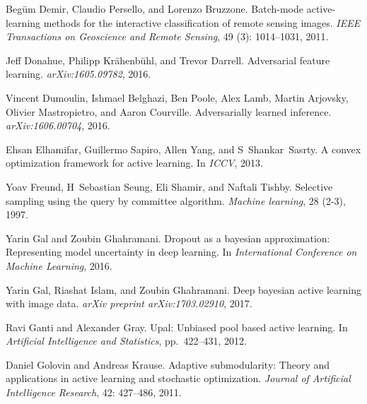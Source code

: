 \documentclass{article} \usepackage{iclr2018_conference,times}
\begin{document}
\begin{thebibliography}{51}
Beg{\"u}m Demir, Claudio Persello, and Lorenzo Bruzzone.
\newblock Batch-mode active-learning methods for the interactive classification
  of remote sensing images.
\newblock \emph{IEEE Transactions on Geoscience and Remote Sensing},
  49 (3): 1014--1031, 2011.

Jeff Donahue, Philipp Kr{\"a}henb{\"u}hl, and Trevor Darrell.
\newblock Adversarial feature learning.
\newblock \emph{arXiv:1605.09782}, 2016.

Vincent Dumoulin, Ishmael Belghazi, Ben Poole, Alex Lamb, Martin Arjovsky,
  Olivier Mastropietro, and Aaron Courville.
\newblock Adversarially learned inference.
\newblock \emph{arXiv:1606.00704}, 2016.

Ehsan Elhamifar, Guillermo Sapiro, Allen Yang, and S~Shankar~Sasrty.
\newblock A convex optimization framework for active learning.
\newblock In \emph{ICCV}, 2013.

Yoav Freund, H~Sebastian Seung, Eli Shamir, and Naftali Tishby.
\newblock Selective sampling using the query by committee algorithm.
\newblock \emph{Machine learning}, 28 (2-3), 1997.

Yarin Gal and Zoubin Ghahramani.
\newblock Dropout as a bayesian approximation: Representing model uncertainty
  in deep learning.
\newblock In \emph{International Conference on Machine Learning}, 2016.

Yarin Gal, Riashat Islam, and Zoubin Ghahramani.
\newblock Deep bayesian active learning with image data.
\newblock \emph{arXiv preprint arXiv:1703.02910}, 2017.

Ravi Ganti and Alexander Gray.
\newblock Upal: Unbiased pool based active learning.
\newblock In \emph{Artificial Intelligence and Statistics}, pp.\  422--431,
  2012.

Daniel Golovin and Andreas Krause.
\newblock Adaptive submodularity: Theory and applications in active learning
  and stochastic optimization.
\newblock \emph{Journal of Artificial Intelligence Research}, 42:
  427--486, 2011.


\end{thebibliography}
\end{document}
